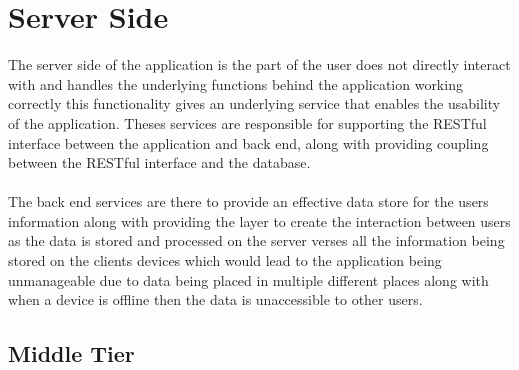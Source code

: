 \section{Server Side}
\label{sec:server_side_design}

The server side of the application is the part of the user does not directly interact with and handles the underlying functions behind the application working correctly this functionality gives an underlying service that enables the usability of the application. Theses services are responsible for supporting the RESTful interface between the application and back end, along with providing coupling between the RESTful interface and the database.\\
\\
The back end services are there to provide an effective data store for the users information along with providing the layer to create the interaction between users as the data is stored and processed on the server verses all the information being stored on the clients devices which would lead to the application being unmanageable due to data being placed in multiple different places along with when a device is offline then the data is unaccessible to other users.\\

\subsection{Middle Tier}

